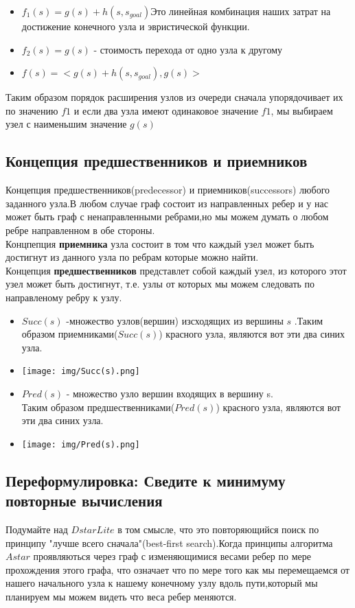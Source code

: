 \documentclass[12pt]{article}
\begin{document}
\begin{itemize}
    \item $f_1(s)=g(s)+h(s,s_{goal})$Это линейная комбинация наших затрат на достижение конечного узла и эвристической функции.
    \item $f_2(s)=g(s)$ - стоимость перехода от одно узла к другому
    \item $f(s)=<g(s)+h(s,s_{goal}),g(s)>$
\end{itemize}
Таким образом порядок расширения узлов из очереди сначала упорядочивает их по значению $f1$  и если два узла имеют одинаковое значение $f1$, мы выбираем узел с наименьшим значение $g(s)$
\hypertarget{b2}{\subsection*{Концепция предшественников и приемников}}
Концепция предшественников(predecessor) и приемников(successors) любого заданного узла.В любом случае граф состоит из направленных ребер и у нас может быть граф с ненаправленными ребрами,но мы можем думать о любом ребре направленном  в обе стороны.\\
Концпепция \textbf{приемника} узла состоит в том что каждый узел может быть достигнут из данного узла по ребрам которые можно найти.\\
Концепция \textbf{предшественников} представлет собой каждый узел, из которого этот узел может быть достигнут, т.е. узлы от которых мы можем следовать по направленому ребру к узлу.
\begin{itemize}
    \item $Succ(s)$ -множество узлов(вершин) изсходящих из вершины $s$ .Таким образом приемниками($Succ(s)$) красного узла, являются вот эти два синих узла.
    \item \texttt{[image: img/Succ(s).png]}
    \item $Pred(s)$ - множество узло вершин входящих в вершину s.\\Таким образом предшественниками($Pred(s)$) красного узла, являются вот эти два синих узла.
    \item \texttt{[image: img/Pred(s).png]}
\end{itemize}
\hypertarget{b3}{\subsection*{Переформулировка: Сведите к минимуму повторные вычисления}}
Подумайте над $D star Lite$ в том смысле, что это повторяющийся поиск по принципу "лучше всего сначала"(best-first search).Когда принципы алгоритма $A star$ проявляються через граф с изменяющимися весами ребер по мере прохождения этого графа, что означает что по мере того как мы перемещаемся от нашего начального узла к нашему конечному узлу вдоль пути,который мы планируем мы можем видеть что веса ребер меняются.
\end{document}
